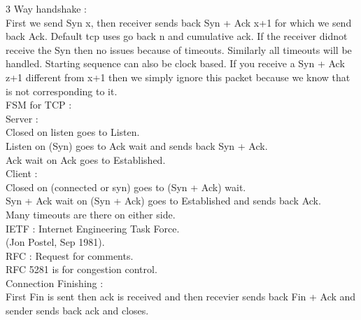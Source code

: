 \documentclass[solution,addpoints,12pt]{exam}
\begin{document}
3 Way handshake :\\
First we send Syn x, then receiver sends back Syn + Ack x+1 for which we send back
Ack. Default tcp uses go back n and cumulative ack.
If the receiver didnot receive the Syn then no issues because of timeouts.
Similarly all timeouts will be handled. Starting sequence can also be
clock based. If you receive a Syn + Ack z+1 different from x+1 then we simply
ignore this packet because we know that is not corresponding to it.\\
FSM for TCP :\\
Server :\\
Closed on listen goes to Listen.\\
Listen on (Syn) goes to Ack wait and sends back Syn + Ack.\\
Ack wait on Ack goes to Established.\\

Client :\\
Closed on (connected or syn) goes to (Syn + Ack) wait.\\
Syn + Ack wait on (Syn + Ack) goes to Established and sends back Ack.\\

Many timeouts are there on either side.\\

IETF : Internet Engineering Task Force.\\
(Jon Postel, Sep 1981).\\
RFC : Request for comments.\\
RFC 5281 is for congestion control.\\

Connection Finishing :\\
First Fin is sent then ack is received and then recevier sends back
Fin + Ack and sender sends back ack and closes.\\
\end{document}
